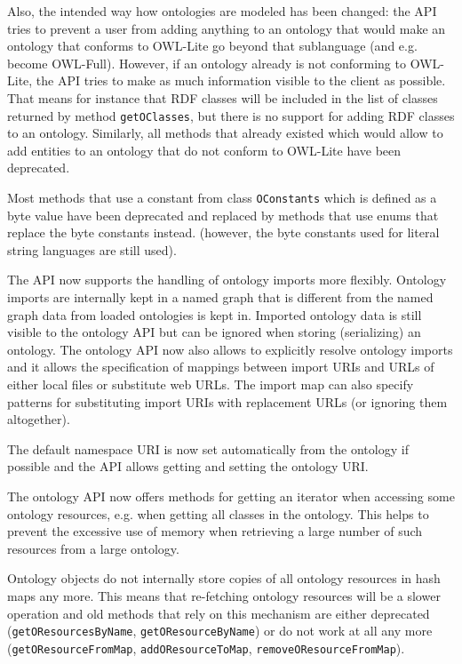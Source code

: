 {Also, the intended way how ontologies are modeled has been changed:
the API tries to prevent a user from adding anything to an 
ontology that would make an ontology that conforms to OWL-Lite 
go beyond that sublanguage (and e.g. become OWL-Full). However,
if an ontology already is not conforming to OWL-Lite, the API
tries to make as much information visible to the client as 
possible. That means for instance that RDF classes will be included
in the list of classes returned by method \texttt{getOClasses}, 
but there is no support for adding RDF classes to an ontology.
Similarly, all methods that already existed which would allow 
to add entities to an ontology that do not conform to OWL-Lite
have been deprecated.

Most methods that use a constant from class \verb!OConstants! which
is defined as a byte value have been deprecated and replaced by
methods that use enums that replace the byte constants instead.
(however, the byte constants used for literal string languages
are still used).

The API now supports the handling of ontology imports more flexibly.
Ontology imports are internally kept in a named graph that is
different from the named graph data from loaded ontologies is 
kept in. Imported ontology data is still visible to the ontology
API but can be ignored when storing (serializing) an ontology.
The ontology API now also allows to explicitly resolve ontology
imports and it allows the specification of mappings between 
import URIs and URLs of either local files or substitute web 
URLs. The import map can also specify patterns for substituting
import URIs with replacement URLs (or ignoring them altogether).

The default namespace URI is now set automatically from the ontology
if possible and the API allows getting and setting the ontology URI.

The ontology API now offers methods for getting an iterator when
accessing some ontology resources, e.g. when getting all classes
in the ontology. This helps to prevent the excessive use of 
memory when retrieving a large number of such resources from
a large ontology.

Ontology objects do not internally store copies of all ontology
resources in hash maps any more. This means that re-fetching 
ontology resources will be a slower operation and old methods that
rely on this mechanism are either deprecated (\verb!getOResourcesByName!, 
\verb!getOResourceByName!) or do not work at all
any more (\verb!getOResourceFromMap!, \verb!addOResourceToMap!, 
\verb!removeOResourceFromMap!).



}
